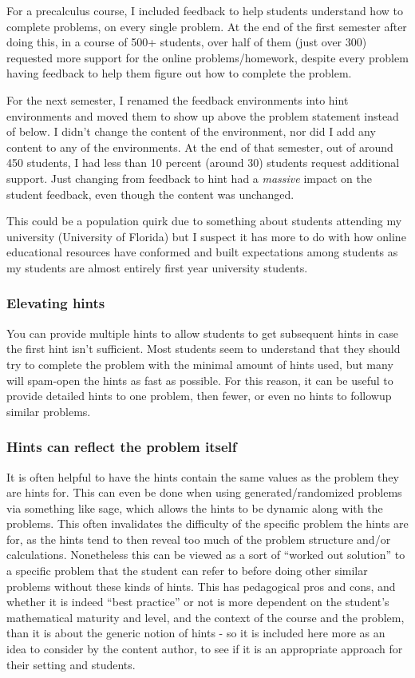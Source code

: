 \documentclass{ximera}
\begin{document}
            For a precalculus course, I included feedback to help students understand how to complete problems, on every single problem. At the end of the first semester after doing this, in a course of 500+ students, over half of them (just over 300) requested more support for the online problems/homework, despite every problem having feedback to help them figure out how to complete the problem. 
            
            For the next semester, I renamed the feedback environments into hint environments and moved them to show up above the problem statement instead of below. I didn't change the content of the environment, nor did I add any content to any of the environments. At the end of that semester, out of around 450 students, I had less than 10 percent (around 30) students request additional support. Just changing from feedback to hint had a \textit{massive} impact on the student feedback, even though the content was unchanged. 
            
            This could be a population quirk due to something about students attending my university (University of Florida) but I suspect it has more to do with how online educational resources have conformed and built expectations among students as my students are almost entirely first year university students.
        
        \subsubsection*{Elevating hints}
            You can provide multiple hints to allow students to get subsequent hints in case the first hint isn't sufficient. Most students seem to understand that they should try to complete the problem with the minimal amount of hints used, but many will spam-open the hints as fast as possible. For this reason, it can be useful to provide detailed hints to one problem, then fewer, or even no hints to followup similar problems. 
        
        \subsubsection*{Hints can reflect the problem itself}
            It is often helpful to have the hints contain the same values as the problem they are hints for. This can even be done when using generated/randomized problems via something like sage, which allows the hints to be dynamic along with the problems. This often invalidates the difficulty of the specific problem the hints are for, as the hints tend to then reveal too much of the problem structure and/or calculations. Nonetheless this can be viewed as a sort of ``worked out solution'' to a specific problem that the student can refer to before doing other similar problems without these kinds of hints. This has pedagogical pros and cons, and whether it is indeed ``best practice'' or not is more dependent on the student's mathematical maturity and level, and the context of the course and the problem, than it is about the generic notion of hints - so it is included here more as an idea to consider by the content author, to see if it is an appropriate approach for their setting and students.
        
\end{document}

